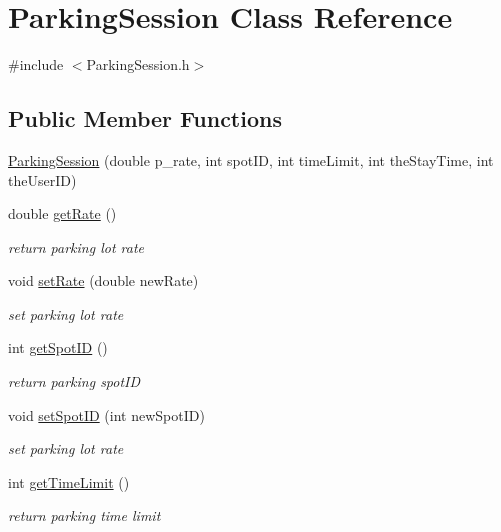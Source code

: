 \hypertarget{class_parking_session}{}\section{Parking\+Session Class Reference}
\label{class_parking_session}


{\ttfamily \#include $<$Parking\+Session.\+h$>$}

\subsection*{Public Member Functions}
\begin{DoxyCompactItemize}
\item 
\mbox{\hyperlink{class_parking_session_ac6fa4013a0d22e2787f3751010097c70}{Parking\+Session}} (double p\+\_\+rate, int spot\+ID, int time\+Limit, int the\+Stay\+Time, int the\+User\+ID)
\item 
double \mbox{\hyperlink{class_parking_session_a025280eba2d68bfa085dcedf249d46dc}{get\+Rate}} ()
\begin{DoxyCompactList}\small\item\em return parking lot rate \end{DoxyCompactList}\item 
void \mbox{\hyperlink{class_parking_session_a7db9217ee7a69467c76787b229fd5a34}{set\+Rate}} (double new\+Rate)
\begin{DoxyCompactList}\small\item\em set parking lot rate \end{DoxyCompactList}\item 
int \mbox{\hyperlink{class_parking_session_ae3627399e8a72370561156dd0d79431d}{get\+Spot\+ID}} ()
\begin{DoxyCompactList}\small\item\em return parking spot\+ID \end{DoxyCompactList}\item 
void \mbox{\hyperlink{class_parking_session_af2014f31a7e793e7edbdcbc40195aff9}{set\+Spot\+ID}} (int new\+Spot\+ID)
\begin{DoxyCompactList}\small\item\em set parking lot rate \end{DoxyCompactList}\item 
int \mbox{\hyperlink{class_parking_session_a661ba75f949f9a5d594f5d08a3ccb619}{get\+Time\+Limit}} ()
\begin{DoxyCompactList}\small\item\em return parking time limit \end{DoxyCompactList}\item 

\end{DoxyCompactItemize}
